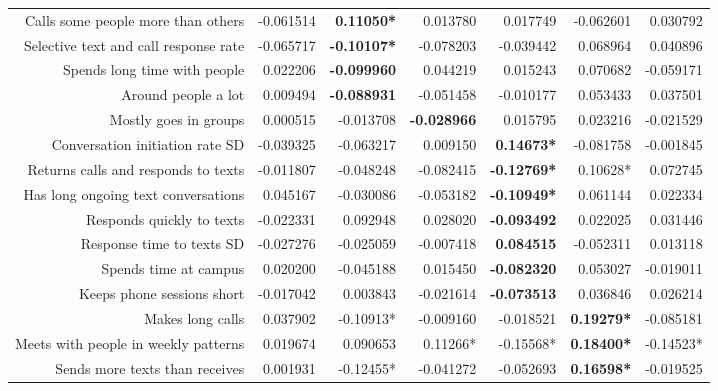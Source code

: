 {\begin{tabular}{rrrrrrr}
Calls some people more than others      & -0.061514				& \textbf{ 0.11050*} 	&  0.013780 			&  0.017749 			& -0.062601 			&  0.030792 		\\
Selective text and call response rate   & -0.065717				& \textbf{-0.10107*} 	& -0.078203 			& -0.039442 			&  0.068964 			&  0.040896 		\\
Spends long time with people            &  0.022206				& \textbf{-0.099960} 	&  0.044219 			&  0.015243 			&  0.070682 			& -0.059171 		\\
Around people a lot                     &  0.009494				& \textbf{-0.088931} 	& -0.051458 			& -0.010177 			&  0.053433 			&  0.037501 		\\
Mostly goes in groups                   &  0.000515				& -0.013708 			& \textbf{-0.028966} 	&  0.015795 			&  0.023216 			& -0.021529 		\\
Conversation initiation rate SD    		& -0.039325				& -0.063217 			&  0.009150 			& \textbf{ 0.14673*} 	& -0.081758 			& -0.001845 		\\
Returns calls and responds to texts     & -0.011807				& -0.048248 			& -0.082415 			& \textbf{-0.12769*} 	&  0.10628* 			&  0.072745 		\\
Has long ongoing text conversations     &  0.045167				& -0.030086 			& -0.053182 			& \textbf{-0.10949*} 	&  0.061144 			&  0.022334 		\\
Responds quickly to texts               & -0.022331				&  0.092948 			&  0.028020 			& \textbf{-0.093492} 	&  0.022025 			&  0.031446 		\\
Response time to texts SD 	         	& -0.027276				& -0.025059 			& -0.007418 			& \textbf{ 0.084515} 	& -0.052311 			&  0.013118 		\\
Spends time at campus                   &  0.020200				& -0.045188 			&  0.015450 			& \textbf{-0.082320} 	&  0.053027 			& -0.019011 		\\
Keeps phone sessions short              & -0.017042				&  0.003843 			& -0.021614 			& \textbf{-0.073513} 	&  0.036846 			&  0.026214 		\\
Makes long calls                        &  0.037902				& -0.10913* 			& -0.009160 			& -0.018521 			& \textbf{ 0.19279*} 	& -0.085181 		\\
Meets with people in weekly patterns    &  0.019674				&  0.090653 			&  0.11266* 			& -0.15568* 			& \textbf{ 0.18400*} 	& -0.14523* 		\\
Sends more texts than receives          &  0.001931				& -0.12455* 			& -0.041272 			& -0.052693 			& \textbf{ 0.16598*} 	& -0.019525 		\\

\end{tabular}}
